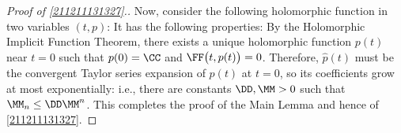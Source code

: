 \documentclass[11pt]{article}
\begin{document}
\begin{proof}[Proof of \autoref{211211131327}.]
Now, consider the following holomorphic function in two variables $(t,p)$:
It has the following properties:
By the Holomorphic Implicit Function Theorem, there exists a unique holomorphic function $p(t)$ near $t = 0$ such that $p(0) = \CC$ and $\FF \big(t, p(t)\big) = 0$.
Therefore, $\hat{p} (t)$ must be the convergent Taylor series expansion of $p(t)$ at $t = 0$, so its coefficients grow at most exponentially: i.e., there are constants $\DD, \MM > 0$ such that $\MM_n \leq \DD \MM^n$.
This completes the proof of the Main Lemma and hence of \autoref{211211131327}.
\end{proof}
\end{document}

